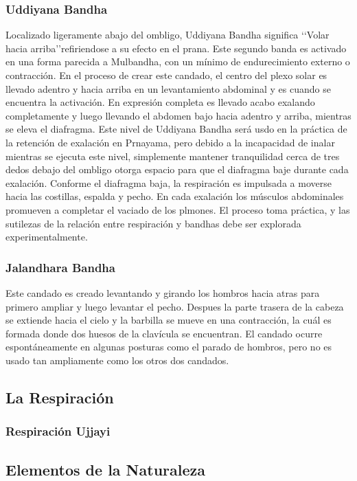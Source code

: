 \documentclass[a4paper]{article}
\begin{document}
\subsubsection{Uddiyana Bandha}
Localizado ligeramente abajo del ombligo, Uddiyana Bandha significa \lq\lq Volar hacia arriba\rq\rq refiriendose a su efecto en el prana. Este segundo banda es activado en una forma parecida a Mulbandha, con un mínimo de endurecimiento externo o contracción. En el proceso de crear este candado, el centro del plexo solar es llevado adentro y hacia arriba en un levantamiento abdominal y es cuando se encuentra la activación. En expresión completa es llevado acabo exalando completamente y luego llevando el abdomen bajo hacia adentro y arriba, mientras se eleva el diafragma. Este nivel de Uddiyana Bandha será usdo en la práctica de la retención de exalación en Prnayama, pero debido a la incapacidad de inalar mientras se ejecuta este nivel, simplemente mantener tranquilidad cerca de tres dedos debajo del ombligo otorga espacio para que el diafragma baje durante cada exalación. Conforme el diafragma baja, la respiración es impulsada a moverse hacia las costillas, espalda y pecho. En cada exalación los músculos abdominales promueven a completar el vaciado de los plmones. El proceso toma práctica, y las sutilezas de la relación entre respiración y bandhas debe ser explorada experimentalmente.


\subsubsection{Jalandhara Bandha}
Este candado es creado levantando y girando los hombros  hacia atras para primero ampliar y luego levantar el pecho. Despues la parte trasera de la cabeza se extiende hacia el cielo y la barbilla se mueve en una contracción, la cuál es formada donde dos huesos de la clavícula se encuentran. El candado ocurre espontáneamente en algunas posturas como el parado de hombros, pero no es usado tan ampliamente como los otros dos candados.

\subsection{La Respiración}
\subsubsection{Respiración Ujjayi}
\subsection{Elementos de la Naturaleza}
\end{document}
